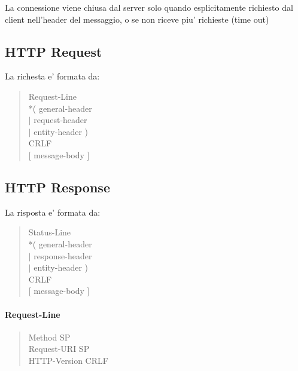 La connessione viene chiusa dal server solo quando esplicitamente richiesto dal client nell'header del messaggio, o se non riceve piu' richieste (time out)




\subsection{HTTP Request}

La richesta e' formata da:
\begin{quote}
    Request-Line \\
    *( general-header \\
    $\vert$ request-header \\
    $\vert$ entity-header ) \\
    CRLF \\
    $[$ message-body $]$
\end{quote}

\subsection{HTTP Response}

La risposta e' formata da:
\begin{quote}
    Status-Line \\
    *( general-header \\
    $\vert$ response-header \\
    $\vert$ entity-header ) \\
    CRLF \\
    $[$ message-body $]$
\end{quote}

\paragraph{Request-Line}
\begin{quote}
    Method SP \\
    Request-URI SP \\
    HTTP-Version CRLF
\end{quote}
